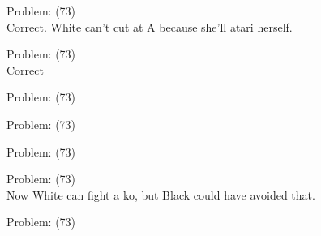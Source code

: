 \documentclass[11pt]{article}
\begin{document}
\begin{minipage}[t]{0.5\textwidth}
  {\centering
  
  Problem: (73)\\
  Correct. White can't cut at A because she'll atari herself.\\
  }
\end{minipage}
\begin{minipage}[t]{0.5\textwidth}
  {\centering
  
  Problem: (73)\\
  Correct\\
  }
\end{minipage}
\begin{minipage}[t]{0.5\textwidth}
  {\centering
  
  Problem: (73)\\
  
  }
\end{minipage}
\begin{minipage}[t]{0.5\textwidth}
  {\centering
  
  Problem: (73)\\
  
  }
\end{minipage}
\begin{minipage}[t]{0.5\textwidth}
  {\centering
  
  Problem: (73)\\
  
  }
\end{minipage}
\begin{minipage}[t]{0.5\textwidth}
  {\centering
  
  Problem: (73)\\
  Now White can fight a ko, but Black could have avoided that.\\
  }
\end{minipage}
\begin{minipage}[t]{0.5\textwidth}
  {\centering
  
  Problem: (73)\\
  
  }
\end{minipage}
\end{document}
